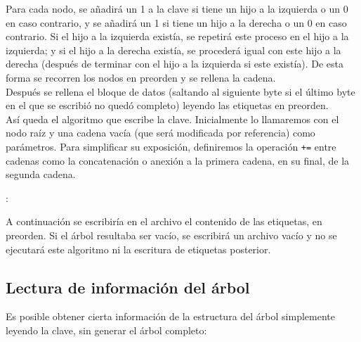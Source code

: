 \documentclass{article}
\newenvironment{algo}{
\vspace*{0.5cm}
\begin{algorithm}[H]}{
\end{algorithm}
\vspace*{0.5cm}
}
\begin{document}
Para cada nodo, se añadirá un 1 a la clave si tiene un hijo a la izquierda o un 0
en caso contrario, y se añadirá un 1 si tiene un hijo a la derecha o un 0 en caso
contrario. Si el hijo a la izquierda existía, se repetirá este proceso en el hijo
a la izquierda; y si el hijo a la derecha existía, se procederá igual con este hijo
a la derecha (después de terminar con el hijo a la izquierda si este existía). De
esta forma se recorren los nodos en preorden y se rellena la cadena. \\

Después se rellena el bloque de datos (saltando al siguiente byte si el último
byte en el que se escribió no quedó completo) leyendo las etiquetas en preorden. \\

Así queda el algoritmo que escribe la clave. Inicialmente lo llamaremos con el
nodo raíz y una cadena vacía (que será modificada por referencia) como parámetros.
Para simplificar su exposición, definiremos la operación \texttt{+=} entre cadenas
como la concatenación o anexión a la primera cadena, en su final, de la segunda
cadena.

\begin{algo}
: \\

\BlankLine


\BlankLine


\end{algo}

A continuación se escribiría en el archivo el contenido de las etiquetas, en
preorden. Si el árbol resultaba ser vacío, se escribirá un archivo vacío y no se
ejecutará este algoritmo ni la escritura de etiquetas posterior.

\subsection{Lectura de información del árbol}

Es posible obtener cierta información de la estructura del árbol simplemente
leyendo la clave, sin generar el árbol completo:
\end{document}

